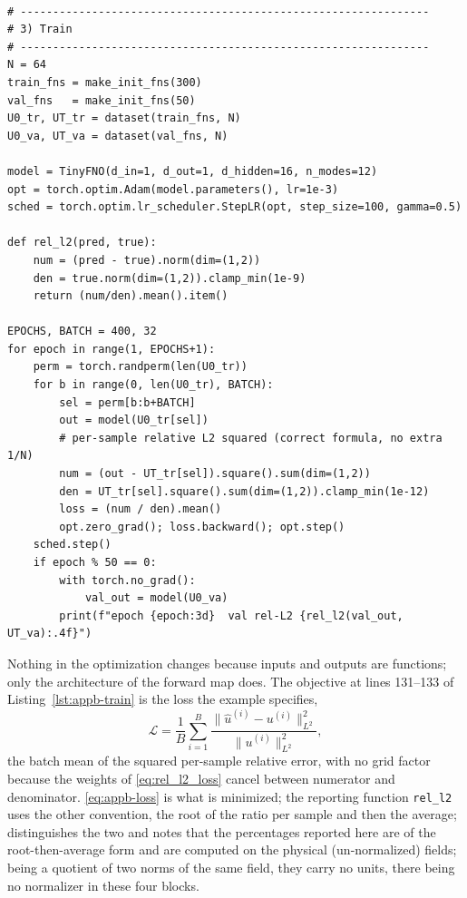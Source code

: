 \begin{lstlisting}[style=appbpystyle, firstnumber=105, caption={\texttt{FNO Worked Example (PyTorch).py}, lines 105--139: the $N=64$ ensembles, the model instance with the hyperparameters of Table~\ref{tab:appb-config}, the reporting metric \texttt{rel\_l2}, and the training loop with its squared relative-$L^2$ objective \eqref{eq:appb-loss}. Printed verbatim; the block opens on the reference file's blank line 105.}, label={lst:appb-train}]

# ---------------------------------------------------------------
# 3) Train
# ---------------------------------------------------------------
N = 64
train_fns = make_init_fns(300)
val_fns   = make_init_fns(50)
U0_tr, UT_tr = dataset(train_fns, N)
U0_va, UT_va = dataset(val_fns, N)

model = TinyFNO(d_in=1, d_out=1, d_hidden=16, n_modes=12)
opt = torch.optim.Adam(model.parameters(), lr=1e-3)
sched = torch.optim.lr_scheduler.StepLR(opt, step_size=100, gamma=0.5)

def rel_l2(pred, true):
    num = (pred - true).norm(dim=(1,2))
    den = true.norm(dim=(1,2)).clamp_min(1e-9)
    return (num/den).mean().item()

EPOCHS, BATCH = 400, 32
for epoch in range(1, EPOCHS+1):
    perm = torch.randperm(len(U0_tr))
    for b in range(0, len(U0_tr), BATCH):
        sel = perm[b:b+BATCH]
        out = model(U0_tr[sel])
        # per-sample relative L2 squared (correct formula, no extra 1/N)
        num = (out - UT_tr[sel]).square().sum(dim=(1,2))
        den = UT_tr[sel].square().sum(dim=(1,2)).clamp_min(1e-12)
        loss = (num / den).mean()
        opt.zero_grad(); loss.backward(); opt.step()
    sched.step()
    if epoch % 50 == 0:
        with torch.no_grad():
            val_out = model(U0_va)
        print(f"epoch {epoch:3d}  val rel-L2 {rel_l2(val_out, UT_va):.4f}")
\end{lstlisting}

Nothing in the optimization changes because inputs and outputs are functions; only the
architecture of the forward map does. The objective at lines
131--133 of Listing~\ref{lst:appb-train} is the loss the example specifies,
\begin{equation}
  \label{eq:appb-loss}
  \mathcal{L} = \frac{1}{B}\sum_{i=1}^{B}
  \frac{\|\hat{u}^{(i)} - u^{(i)}\|_{L^2}^2}{\|u^{(i)}\|_{L^2}^2},
\end{equation}
the batch mean of the squared per-sample relative error, with no grid factor because
the weights of \eqref{eq:rel_l2_loss} cancel between numerator and denominator.
\eqref{eq:appb-loss} is what is minimized; the reporting function \texttt{rel\_l2}
uses the other convention, the root of the ratio
per sample and then the average;
 distinguishes the two
and notes that the percentages reported here are of the root-then-average form and are
computed on the physical (un-normalized) fields; being a quotient of two norms of the
same field, they carry no units, there being no normalizer in these four blocks.

